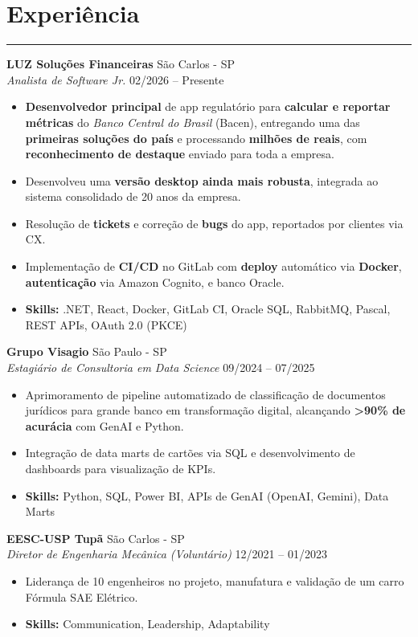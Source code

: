 \documentclass[10pt,a4paper]{article}
\begin{document}
\section*{Experiência}
\hrule \vspace{2mm}
\textbf{LUZ Soluções Financeiras} \hfill São Carlos - SP \\
\textit{Analista de Software Jr.} \hfill 02/2026 -- Presente
\begin{itemize}[nosep]
    \item \textbf{Desenvolvedor principal} de app regulatório para \textbf{calcular e reportar métricas} do \textit{Banco Central do Brasil} (Bacen), entregando uma das \textbf{primeiras soluções do país} e processando \textbf{milhões de reais}, com \textbf{reconhecimento de destaque} enviado para toda a empresa.
    \item Desenvolveu uma \textbf{versão desktop ainda mais robusta}, integrada ao sistema consolidado de 20 anos da empresa.
    \item Resolução de \textbf{tickets} e correção de \textbf{bugs} do app, reportados por clientes via CX.
    \item Implementação de \textbf{CI/CD} no GitLab com \textbf{deploy} automático via \textbf{Docker}, \textbf{autenticação} via Amazon Cognito, e banco Oracle.
    \item \textbf{Skills:} .NET, React, Docker, GitLab CI, Oracle SQL, RabbitMQ, Pascal, REST APIs, OAuth 2.0 (PKCE)
\end{itemize}

\textbf{Grupo Visagio} \hfill São Paulo - SP \\
\textit{Estagiário de Consultoria em Data Science} \hfill 09/2024 -- 07/2025
\begin{itemize}[nosep]
    \item Aprimoramento de pipeline automatizado de classificação de documentos jurídicos para grande banco em transformação digital, alcançando \textbf{>90\% de acurácia} com GenAI e Python.
    \item Integração de data marts de cartões via SQL e desenvolvimento de dashboards para visualização de KPIs.
    \item \textbf{Skills:} Python, SQL, Power BI, APIs de GenAI (OpenAI, Gemini), Data Marts
\end{itemize}

\textbf{EESC-USP Tupã} \hfill São Carlos - SP \\
\textit{Diretor de Engenharia Mecânica (Voluntário)} \hfill 12/2021 -- 01/2023
\begin{itemize}[nosep]
    \item Liderança de 10 engenheiros no projeto, manufatura e validação de um carro Fórmula SAE Elétrico.
    \item \textbf{Skills:} Communication, Leadership, Adaptability
\end{itemize}
\end{document}
